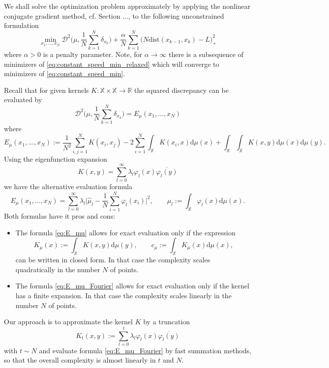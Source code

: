 \documentclass[draft,
a4paper,11pt,DIV=11,%
abstract=on%
]{scrartcl}
\begin{document}
We shall solve the optimization problem approximately by applying the nonlinear conjugate gradient method, cf. {\color{blue} Section ...}, to the following unconstrained formulation
\begin{equation}
  \label{eq:constant_speed_min_relaxed}
  \min_{x_{1},\dots,x_{N}} \mathscr{D}^{2} \Big(\mu, \frac{1}{N} \sum_{k=1}^{N} \delta_{x_{k}}\Big) +   \frac{\alpha}{N} \sum_{k=1}^{N} \big(N \mathrm{dist}(x_{k-1},x_{k}) - L \big)_{+}^{2}
\end{equation}
where $\alpha > 0$ is a penalty parameter. Note, for $\alpha \to \infty$ there is a subsequence of minimizers of \eqref{eq:constant_speed_min_relaxed} which will converge to minimizers of \eqref{eq:constant_speed_min}.

Recall that for given kernels $K:\mathbb X\times \mathbb X \to \mathbb R$ the squared discrepancy can be evaluated by
\[
  \mathscr D^{2}\Big(\mu, \frac 1N \sum_{k=1}^{N} \delta_{x_{k}}\Big) = E_{\mu}(x_{1},\dots,x_{N})
\]
where
\begin{equation}
  \label{eq:E_mu}
  E_{\mu}(x_{1},\dots,x_{N}) :=
    \frac{1}{N^{2}}\sum_{i,j=1}^{N} K(x_{i},x_{j}) - 2\sum_{i=1}^{N} \int_{\mathbb X} K(x_{i},x) \mathrm d\mu(x) + \int_{\mathbb X}\int_{\mathbb X} K(x,y) \mathrm d\mu(x) \mathrm d\mu(y).
  \end{equation}
Using the eigenfunction expansion
\[
 K(x,y) = \sum_{l=0}^{\infty} \lambda_{l} \varphi_{l}(x) \overline{\varphi_{l}(y)} 
\]
we have the alternative evaluation formula
\begin{equation}
  \label{eq:E_mu_Fourier}
  E_{\mu}(x_{1},\dots,x_{N}) = \sum_{l=0}^{\infty} \lambda_{l} \Big| \hat\mu_{l}
  - \frac 1N \sum_{i=1}^{N} \varphi_{l}(x_{i}) \Big|^{2}, \quad\quad \mu_{l} := \int_{\mathbb X} \varphi_{l}(x) \mathrm d\mu(x).
\end{equation}
Both formulas have it pros and cons:
\begin{itemize}
\item The formula \eqref{eq:E_mu} allows for exact evaluation only if the expression
\[
  K_{\mu}(x) := \int_{\mathbb X} K(x,y) \mathrm d\mu(y), \qquad  c_{\mu} := \int_{\mathbb X} K_{\mu}(x) \mathrm d\mu(x),
\]
can be written in closed form. In that case the complexity scales quadratically in the number $N$ of points.

\item The formula \eqref{eq:E_mu_Fourier} allows for exact evaluation only if the kernel has a finite expansion. In that case the complexity scales linearly in the number $N$ of points. 
\end{itemize}
Our approach is to approximate the kernel $K$ by a truncation
\[
  K_{t}(x,y) := \sum_{l=0}^{t} \lambda_{l} \varphi_{l}(x) \overline{\varphi_{l}(y)}
\]
with $t \sim N$ and evaluate formula \eqref{eq:E_mu_Fourier} by fast summation methods, so that the overall complexity is almost linearly in $t$ and $N$. 
\end{document}
